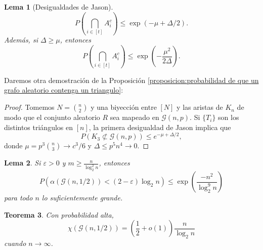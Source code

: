 \documentclass[12pt]{report}
\theoremstyle{plain}
\newtheorem{theorem}{Teorema}[section]
\newtheorem{lemma}[theorem]{Lema}
\theoremstyle{definition}
\begin{document}
\begin{lemma}[Desigualdades de Jason]
\[
    P (\bigcap_{i \in [t]} A_i^c) \leq \exp (- \mu + \Delta / 2).
\]
Además, si $\Delta \geq \mu$, entonces
\[
P (\bigcap_{ i \in [t]} A_i^c) \leq \exp ( - \frac{\mu^2}{2 \Delta}).
\]
\end{lemma}

Daremos otra demostración de la Proposición \ref{proposicion:probabilidad de que un grafo aleatorio contenga un triangulo}:

\begin{proof}
    Tomemos $N = \binom n 2$ y una biyección entre $[N]$ y las aristas de $K_n$ de modo que el conjunto aleatorio $R$ sea mapeado en $\mathcal G (n, p)$. Si $\{T_i\}$ son los distintos triángulos en $[n]$, la primera desigualdad de Jason implica que
    \[
        P (K_3 \not \subset \mathcal G (n, p)) \leq e^{- \mu + \Delta / 2},
    \]
    donde $\mu = p^3 \binom n 3 \to c^3 / 6$ y $\Delta \leq p^5 n^4 \to 0$.
\end{proof}


\begin{lemma}
Si $\varepsilon > 0$ y $m \geq \frac{n}{\log ^2_2 n}$, entonces
\[
    P (\alpha (\mathcal G (n, 1/2)) < (2 - \varepsilon) \log_2 n) \leq \exp \left ( \frac{-n^2}{\log^9_2 n} \right )
\]
para todo $n$ lo suficientemente grande.
\end{lemma}

\begin{theorem}
Con probabilidad alta,
\[
    \chi (\mathcal G (n, 1/2)) = \left (\frac 1 2 + o(1) \right ) \frac{n}{\log_2 n}
\]
cuando $n \to \infty$.
\end{theorem}
\end{document}
